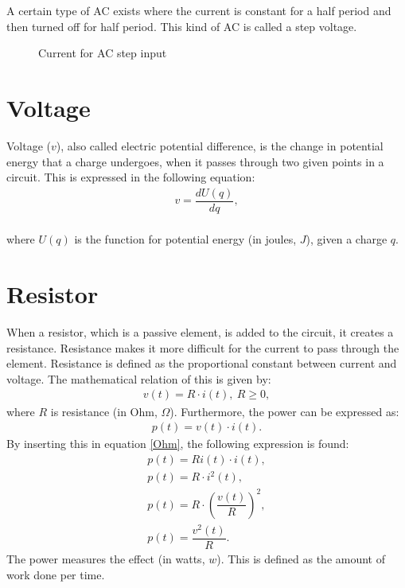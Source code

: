 \noindent A certain type of AC exists where the current is constant for a half period and then turned off for half period. This kind of AC is called a step voltage.
\begin{figure}[H] 

\caption{Current for AC step input}
\end{figure}
\section{Voltage}
Voltage ($v$), also called electric potential difference, is the change in potential energy that a charge undergoes, when it passes through two given points in a circuit. This is expressed in the following equation:
\begin{align*}
	v=\dfrac{dU(q)}{dq},
\end{align*}
\\
where $U(q)$ is the function for potential energy (in joules, $J$), given a charge $q$.
\section{Resistor}
When a resistor, which is a passive element, is added to the circuit, it creates a resistance. Resistance makes it more difficult for the current to pass through the element. Resistance is defined as the proportional constant between current and voltage. The mathematical relation of this is given by: \cite[p.~22]{bcircuit5}
\begin{align} 
\label{Ohm}
v(t)=R\cdot i(t),\ R\geq0,
\end{align}
where $R$ is resistance (in Ohm, $\Omega$). Furthermore, the power can be expressed as: \cite[p.~22]{bcircuit5} 
\begin{align} 
\label{power}
p(t)=v(t)\cdot i(t).
\end{align}
By inserting this in equation \eqref{Ohm}, the following expression is found:
\begin{align}
p(t)=Ri(t)\cdot i(t), \nonumber \\
p(t)=R \cdot i^2(t), \nonumber \\
p(t)=R \cdot \left(\dfrac{v(t)}{R} \right)^2, \nonumber \\
p(t)=\dfrac{v^2(t)}{R}. \label{resistor:power}
\end{align}
The power measures the effect (in watts, $w$). This is defined as the amount of work done per time. 
